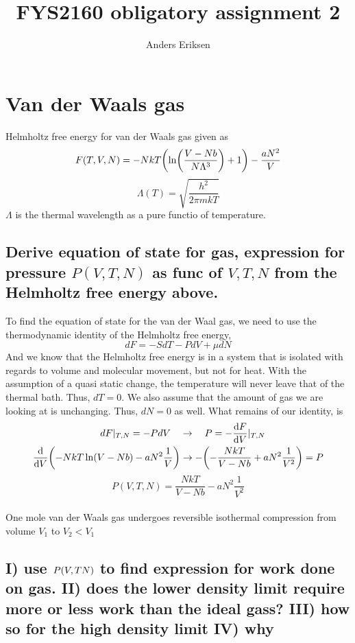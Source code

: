 \documentclass[a4paper,11pt]{article}
\begin{document}
	
\title{FYS2160 obligatory assignment 2}
\author{Anders Eriksen}
\maketitle


\section{Van der Waals gas}
Helmholtz free energy for van der Waals gas given as
\[ F( T, V, N ) = - N k T \qty( \ln(\frac{  V - Nb  }{ N\Lambda^3 } ) + 1 ) - \frac{ a N^2 }{ V } \]
\[ \Lambda( T ) = \sqrt{ \frac{ h^2 }{ 2\pi m k T } }  \]
$\Lambda$ is the thermal wavelength as a pure functio of temperature. 

\subsection{ Derive equation of state for gas, expression for pressure $P( V, T, N )$ as func of 
            $V, T, N$ from the Helmholtz free energy above. }%
To find the equation of state for the van der Waal gas, we need to use the thermodynamic identity of the Helmholtz free
energy, 
\[ dF = - SdT - PdV + \mu dN \]
And we know that the Helmholtz free energy is in a system that is isolated with regards to volume and molecular movement, but
not for heat. With the assumption of a quasi static change, the temperature will never leave that of the thermal bath. Thus, $dT=0$.
We also assume that the amount of gas we are looking at is unchanging. Thus, $dN=0$ as well. What remains of our identity, is
\begin{align*}
    dF|_{T,N} = - PdV \quad &\rightarrow \quad P = -\dv{F}{V}|_{T,N} \\
    \dv{V}\qty( -NkT\ln( V - Nb) - aN^2\frac{1}{V} ) &\rightarrow -\qty( -\frac{NkT}{V - Nb} + aN^2\frac{1}{V^2} ) = P \\
\end{align*}
\[ P( V, T, N ) =  \frac{NkT}{V - Nb} - aN^2\frac{1}{V^2} \]\\


One mole van der Waals gas undergoes reversible isothermal compression from volume $V_1$ to $V_2 < V_1$

\subsection{ I) use $P\qty(V, T N)$ to find expression for work done on gas. II) does the lower density 
            limit require more or less work than the ideal gass? III) how so for the high density limit IV) why}%
\end{document}
